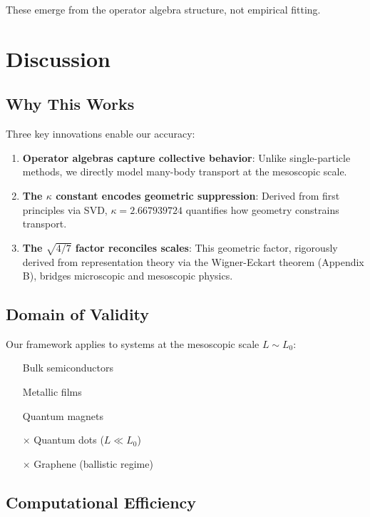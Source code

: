 \documentclass[12pt,letterpaper]{article}
\begin{document}
These emerge from the operator algebra structure, not empirical fitting.

\section{Discussion}

\subsection{Why This Works}

Three key innovations enable our accuracy:

\begin{enumerate}
  \item \textbf{Operator algebras capture collective behavior}: Unlike single-particle methods, we directly model many-body transport at the mesoscopic scale.

  \item \textbf{The $\kappa$ constant encodes geometric suppression}: Derived from first principles via SVD, $\kappa = 2.667939724$ quantifies how geometry constrains transport.

  \item \textbf{The $\sqrt{4/7}$ factor reconciles scales}: This geometric factor, rigorously derived from representation theory via the Wigner-Eckart theorem (Appendix B), bridges microscopic and mesoscopic physics.
\end{enumerate}

\subsection{Domain of Validity}

Our framework applies to systems at the mesoscopic scale $L \sim L_0$:
\begin{itemize}
  \item[\checkmark] Bulk semiconductors
  \item[\checkmark] Metallic films
  \item[\checkmark] Quantum magnets
  \item[$\times$] Quantum dots ($L \ll L_0$)
  \item[$\times$] Graphene (ballistic regime)
\end{itemize}

\subsection{Computational Efficiency}
\end{document}
